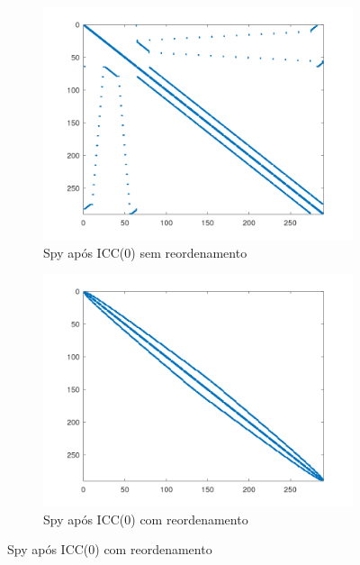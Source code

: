 \begin{figure}[H]
    \centering
    \begin{subfigure}[t]{0.4\linewidth}
         \centering
         \includegraphics[width=\textwidth]{images/mesh3em5_spyM_ICC(0)_sem.png}
         \caption{Spy após ICC(0) sem reordenamento}
         \label{fig:mesh-icc0-sem}
    \end{subfigure}
    \quad
    \begin{subfigure}[t]{0.4\linewidth}
         \centering
         \includegraphics[width=\textwidth]{images/mesh3em5_spyM_ICC(0)_com.png}
         \caption{Spy após ICC(0) com reordenamento}
         \label{fig:mesh-icc0-com}
    \end{subfigure}

\end{figure}
